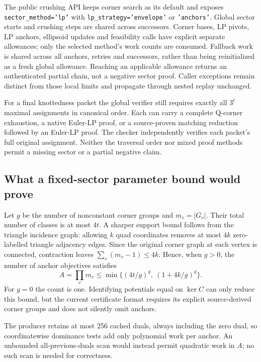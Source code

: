 The public crushing API keeps corner search as its default and exposes
\texttt{sector\_method='lp'} with \texttt{lp\_strategy='envelope'} or
\texttt{'anchors'}.  Global sector starts and crushing steps are shared
across successors.  Corner bases, LP pivots, LP anchors, ellipsoid updates and feasibility
calls have explicit separate allowances; only the selected method's work
counts are consumed.  Fallback work is shared across all anchors, retries
and successors, rather than being reinitialized as a fresh global allowance.
Reaching an applicable allowance returns an authenticated partial chain,
not a negative sector proof.  Caller exceptions remain distinct from those
local limits and propagate through nested replay unchanged.

For a final knottedness packet the global verifier still requires exactly
all $3^t$ maximal assignments in canonical order.  Each can carry a complete
Q-corner exhaustion, a native Euler-LP proof, or a source-proven matching
reduction followed by an Euler-LP proof.  The checker independently verifies
each packet's full original assignment.  Neither the traversal order nor
mixed proof methods permit a missing sector or a partial negative claim.

\subsection{What a fixed-sector parameter bound would prove}

Let $g$ be the number of nonconstant corner groups and $m_v=|G_v|$.  Their
total number of classes is at most $4t$.  A sharper support bound follows
from the triangle incidence graph: allowing $k$ quad coordinates removes
at most $4k$ zero-labelled triangle adjacency edges.  Since the original
corner graph at each vertex is connected, contraction leaves
$\sum_v(m_v-1)\leq4k$.  Hence, when $g>0$, the number of anchor objectives
satisfies
\[
 A=\prod_v m_v\leq
 \min\{(4t/g)^g,\ (1+4k/g)^g\}.
\]
For $g=0$ the count is one.  Identifying potentials equal on $\ker C$ can
only reduce this bound, but the current certificate format requires its
explicit source-derived corner groups and does not silently omit anchors.

The producer retains at most 256 cached duals, always including the zero
dual, so coordinatewise dominance tests add only polynomial work per
anchor.  An unbounded all-previous-duals scan would instead permit quadratic
work in $A$; no such scan is needed for correctness.


